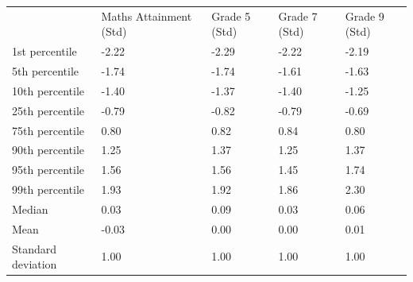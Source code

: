 \documentclass{article}
\begin{document}
\begin{table}[!h]
\centering
\begin{tabular}{lllll}
\cline{1-5}
\multicolumn{1}{|l}{} &
  \multicolumn{1}{|l}{Maths Attainment (Std)} &
  \multicolumn{1}{|l}{Grade 5 (Std)} &
  \multicolumn{1}{|l}{Grade 7 (Std)} &
  \multicolumn{1}{|l|}{Grade 9 (Std)} \\
\cline{1-5}
\multicolumn{1}{|l}{1st percentile} &
  \multicolumn{1}{|l}{-2.22} &
  \multicolumn{1}{|l}{-2.29} &
  \multicolumn{1}{|l}{-2.22} &
  \multicolumn{1}{|l|}{-2.19} \\
\cline{1-5}
\multicolumn{1}{|l}{5th percentile} &
  \multicolumn{1}{|l}{-1.74} &
  \multicolumn{1}{|l}{-1.74} &
  \multicolumn{1}{|l}{-1.61} &
  \multicolumn{1}{|l|}{-1.63} \\
\cline{1-5}
\multicolumn{1}{|l}{10th percentile} &
  \multicolumn{1}{|l}{-1.40} &
  \multicolumn{1}{|l}{-1.37} &
  \multicolumn{1}{|l}{-1.40} &
  \multicolumn{1}{|l|}{-1.25} \\
\cline{1-5}
\multicolumn{1}{|l}{25th percentile} &
  \multicolumn{1}{|l}{-0.79} &
  \multicolumn{1}{|l}{-0.82} &
  \multicolumn{1}{|l}{-0.79} &
  \multicolumn{1}{|l|}{-0.69} \\
\cline{1-5}
\multicolumn{1}{|l}{75th percentile} &
  \multicolumn{1}{|l}{0.80} &
  \multicolumn{1}{|l}{0.82} &
  \multicolumn{1}{|l}{0.84} &
  \multicolumn{1}{|l|}{0.80} \\
\cline{1-5}
\multicolumn{1}{|l}{90th percentile} &
  \multicolumn{1}{|l}{1.25} &
  \multicolumn{1}{|l}{1.37} &
  \multicolumn{1}{|l}{1.25} &
  \multicolumn{1}{|l|}{1.37} \\
\cline{1-5}
\multicolumn{1}{|l}{95th percentile} &
  \multicolumn{1}{|l}{1.56} &
  \multicolumn{1}{|l}{1.56} &
  \multicolumn{1}{|l}{1.45} &
  \multicolumn{1}{|l|}{1.74} \\
\cline{1-5}
\multicolumn{1}{|l}{99th percentile} &
  \multicolumn{1}{|l}{1.93} &
  \multicolumn{1}{|l}{1.92} &
  \multicolumn{1}{|l}{1.86} &
  \multicolumn{1}{|l|}{2.30} \\
\cline{1-5}
\multicolumn{1}{|l}{Median} &
  \multicolumn{1}{|l}{0.03} &
  \multicolumn{1}{|l}{0.09} &
  \multicolumn{1}{|l}{0.03} &
  \multicolumn{1}{|l|}{0.06} \\
\cline{1-5}
\multicolumn{1}{|l}{Mean} &
  \multicolumn{1}{|l}{-0.03} &
  \multicolumn{1}{|l}{0.00} &
  \multicolumn{1}{|l}{0.00} &
  \multicolumn{1}{|l|}{0.01} \\
\cline{1-5}
\multicolumn{1}{|l}{Standard deviation} &
  \multicolumn{1}{|l}{1.00} &
  \multicolumn{1}{|l}{1.00} &
  \multicolumn{1}{|l}{1.00} &
  \multicolumn{1}{|l|}{1.00} \\
\cline{1-5}
\end{tabular}
\end{table}
\end{document}
